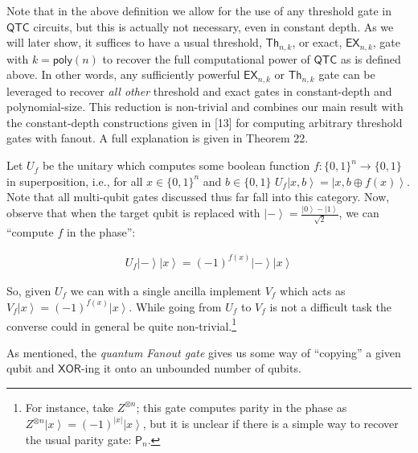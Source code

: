 Note that in the above definition we allow for the use of any threshold gate in ${\mathsf{QTC}}$ circuits, but this is actually not necessary, even in constant depth. As we will later show, it suffices to have a usual threshold, $\mathsf{Th}_{n,k}$, or exact, $\mathsf{EX}_{n,k}$, gate with $k={\mathsf{poly}}(n)$ to recover the full computational power of ${\mathsf{QTC}}$ as is defined above. In other words, any sufficiently powerful $\mathsf{EX}_{n,k}$ or $\mathsf{Th}_{n,k}$ gate can be leveraged to recover \emph{all other} threshold and exact gates in constant-depth and polynomial-size. This reduction is non-trivial and combines our main result with the constant-depth constructions given in [13] for computing arbitrary threshold gates with fanout. A full explanation is given in Theorem 22.\par




Let $U_{f}$ be the unitary which computes some boolean function $f:\{0,1\}^{n}\to\{0,1\}$ in superposition, i.e., for all $x\in\{0,1\}^{n}$ and $b\in\{0,1\}$ $U_{f}\left|x,b\right\rangle=\left|x,b\oplus f(x)\right\rangle$. Note that all multi-qubit gates discussed thus far fall into this category. Now, observe that when the target qubit is replaced with $\left|-\right\rangle=\frac{\left|0\right\rangle-\left|1\right\rangle}{\sqrt{2}}$, we can “compute $f$ in the phase”:\par


\[\begin{gathered}
\displaystyle U_{f}\left|-\right\rangle\left|x\right\rangle=(-1)^{f(x)}\left|-\right\rangle\left|x\right\rangle
\end{gathered}\]


So, given $U_{f}$ we can with a single ancilla implement $V_{f}$ which acts as $V_{f}\left|x\right\rangle=(-1)^{f(x)}\left|x\right\rangle$. While going from $U_{f}$ to $V_{f}$ is not a difficult task the converse could in general be quite non-trivial.\footnote{For instance, take $Z^{\otimes n}$; this gate computes parity in the phase as $Z^{\otimes n}\left|x\right\rangle=(-1)^{|x|}\left|x\right\rangle$, but it is unclear if there is a simple way to recover the usual parity gate: $\mathsf{P}_{n}$.}\par




As mentioned, the \emph{quantum Fanout gate} gives us some way of “copying” a given qubit and $\mathsf{XOR}$-ing it onto an unbounded number of qubits.\par



